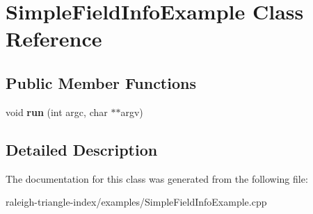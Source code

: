 \section{Simple\+Field\+Info\+Example Class Reference}
\label{class_simple_field_info_example}
\subsection*{Public Member Functions}
\begin{DoxyCompactItemize}
\item 
void {\bfseries run} (int argc, char $\ast$$\ast$argv)\label{class_simple_field_info_example_a41eaf525c1b922623a53fdf9a46e7d5b}

\end{DoxyCompactItemize}


\subsection{Detailed Description}


The documentation for this class was generated from the following file\+:\begin{DoxyCompactItemize}
\item 
raleigh-\/triangle-\/index/examples/Simple\+Field\+Info\+Example.\+cpp\end{DoxyCompactItemize}
